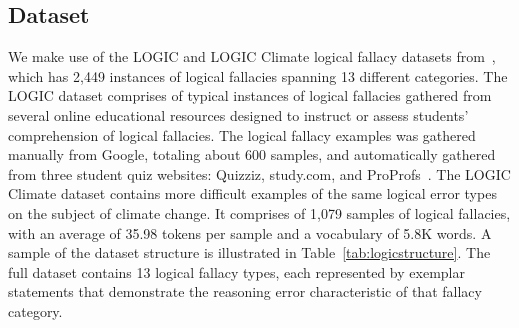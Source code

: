 \documentclass[runningheads]{llncs}
\begin{document}
\subsection{Dataset}
We make use of the LOGIC and LOGIC Climate logical fallacy datasets from~\cite{jin2022logical}, which has 2,449 instances of logical fallacies spanning 13 different categories. The LOGIC dataset comprises of typical instances of logical fallacies gathered from several online educational resources designed to instruct or assess students' comprehension of logical fallacies. The logical fallacy examples was gathered manually from Google, totaling about 600 samples, and automatically gathered from three student quiz websites: Quizziz, study.com, and ProProfs~\cite{jin2022logical}. The LOGIC Climate dataset contains more difficult examples of the same logical error types on the subject of climate change. It comprises of 1,079 samples of logical fallacies, with an average of 35.98 tokens per sample and a vocabulary of 5.8K words. 
A sample of the dataset structure is illustrated in Table~\ref{tab:logicstructure}. The full dataset contains 13 logical fallacy types, each represented by exemplar statements that demonstrate the reasoning error characteristic of that fallacy category.
\end{document}
